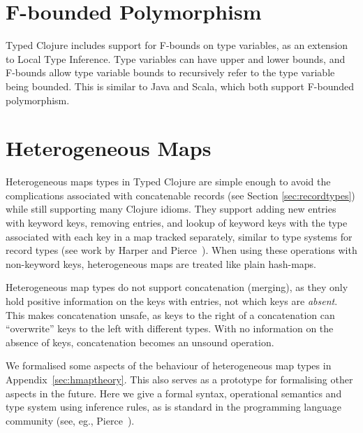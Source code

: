\section{F-bounded Polymorphism}

Typed Clojure includes support for F-bounds on type variables\cite{CCHOM89}, as an extension
to Local Type Inference. 
Type variables can have upper and lower bounds, and F-bounds allow type variable bounds
to recursively refer to the type variable being bounded.
This is similar to Java and Scala, which both support F-bounded polymorphism.

\section{Heterogeneous Maps}
\label{ref:designhmap}

Heterogeneous maps types in Typed Clojure are simple enough to avoid
the complications associated with concatenable records (see Section \ref{sec:recordtypes})
while still supporting many Clojure idioms.
They support adding new entries with keyword keys, removing entries,
and lookup of keyword keys with the type associated with each key in
a map tracked separately, similar to type systems for record types 
(see work by Harper and Pierce~\cite{HP91}).
When using these operations with non-keyword keys, heterogeneous maps
are treated like plain hash-maps.

Heterogeneous map types do not support concatenation (merging), as they
only hold positive information on the keys with entries, not
which keys are \emph{absent}.
This makes concatenation unsafe, as keys to the right of a
concatenation can ``overwrite'' keys to the left with different types. With no information
on the absence of keys, concatenation becomes an unsound operation.

We formalised some aspects of the behaviour of heterogeneous map types in Appendix~\ref{sec:hmaptheory}.
This also serves as a prototype for formalising other aspects in the future.
Here we give a formal syntax, operational semantics and type system using inference
rules, as is standard in the programming language community (see, eg., Pierce~\cite{Pie02}).

